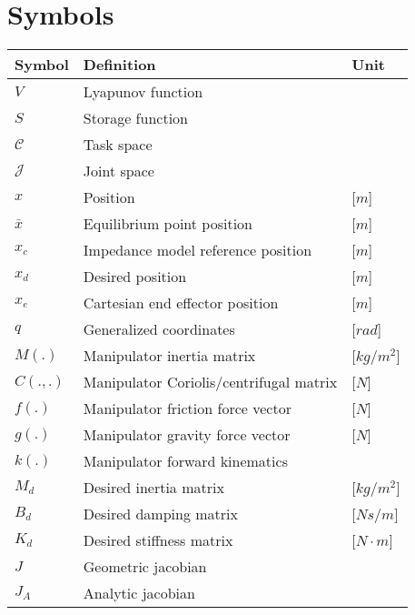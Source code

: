 \section*{Symbols}

\begin{longtable}{p{2.5cm}p{8cm}p{2.5cm}}
    \toprule
    Symbol              & Definition                              & Unit         \\
    \midrule\endhead %
    $V$                 & Lyapunov function                       &              \\
    $S$                 & Storage function                        &              \\
    $\mathcal{C}$       & Task space                              &              \\
    $\mathcal{J}$       & Joint space                             &              \\
    $x$                 & Position                                & [$m$]        \\
    $\bar{x}$           & Equilibrium point position              & [$m$]        \\
    $x_c$               & Impedance model reference position      & [$m$]        \\
    $x_d$               & Desired position                        & [$m$]        \\
    $x_e$               & Cartesian end effector position         & [$m$]        \\
    $q$                 & Generalized coordinates                 & [$rad$]      \\
    $M\left(.\right)$   & Manipulator inertia matrix              & [$kg/m^2$]   \\
    $C\left(.,.\right)$ & Manipulator Coriolis/centrifugal matrix & [$N$]        \\
    $f\left(.\right)$   & Manipulator friction force vector       & [$N$]        \\
    $g\left(.\right)$   & Manipulator gravity force vector        & [$N$]        \\
    $k\left(.\right)$   & Manipulator forward kinematics          &              \\
    $M_d$               & Desired inertia matrix                  & [$kg/m^2$]   \\
    $B_d$               & Desired damping matrix                  & [$Ns/m$]     \\
    $K_d$               & Desired stiffness matrix                & [$N\cdot m$] \\
    $J$                 & Geometric jacobian                      &              \\
    $J_A$               & Analytic jacobian                       &              \\
    \bottomrule
\end{longtable}
